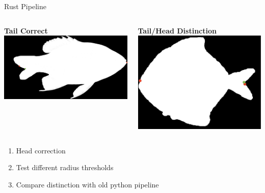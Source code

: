 \begin{frame}{Rust Pipeline}
  \begin{columns}[c]
        \centering
        \textbf{Tail Correct}\\[1ex]
        \includegraphics[height=0.48\textheight,keepaspectratio]{./images/fish2_out.png}
  
        \centering
        \textbf{Tail/Head Distinction}\\[1ex]
        \includegraphics[height=0.48\textheight,keepaspectratio]{./images/fish6_out.png}
  \end{columns}
      \begin{enumerate}
        \item Head correction
        \item Test different radius thresholds
        \item Compare distinction with old python pipeline
    \end{enumerate}
\end{frame}

